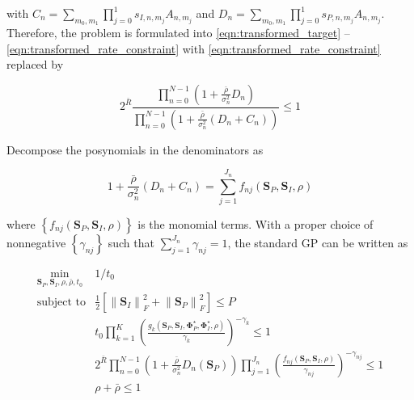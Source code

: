 with ${C_n} = \sum\nolimits_{{m_0},{m_1}} {\prod\nolimits_{j = 0}^1 {{s_{I,n,{m_j}}}{A_{n,{m_j}}}} } $ and ${D_n} = \sum\nolimits_{{m_0},{m_1}} {\prod\nolimits_{j = 0}^1 {{s_{P,n,{m_j}}}{A_{n,{m_j}}}} } $. Therefore, the problem is formulated into \ref{eqn:transformed_target} -- \ref{eqn:transformed_rate_constraint} with \ref{eqn:transformed_rate_constraint} replaced by

\begin{equation}\label{eqn:transformed_rate_constraint_lower_bound}
  {2^{\bar R}}\frac{{\prod\limits_{n = 0}^{N - 1} {\left( {1 + \frac{{\bar \rho }}{{\sigma _n^2}}{D_n}} \right)} }}{{\prod\limits_{n = 0}^{N - 1} {\left( {1 + \frac{{\bar \rho }}{{\sigma _n^2}}\left( {{D_n} + {C_n}} \right)} \right)} }} \leqslant 1
\end{equation}

Decompose the posynomials in the denominators as

\begin{equation}\label{eqn:posynomial_lower_bound}
  1 + \frac{{\bar \rho }}{{\sigma _n^2}}\left( {{D_n} + {C_n}} \right) = \sum\limits_{j = 1}^{{J_n}} {{f_{nj}}\left( {{{\mathbf{S}}_P},{{\mathbf{S}}_I},\rho } \right)}
\end{equation}

where $\left\{ {{f_{nj}}\left( {{{\mathbf{S}}_P},{{\mathbf{S}}_I},\rho } \right)} \right\}$ is the monomial terms. With a proper choice of nonnegative $\left\{ {{\gamma _{nj}}} \right\}$ such that $\sum\limits_{j = 1}^{{J_n}} {{\gamma _{nj}}}  = 1$, the standard GP can be written as

\begin{eqnarray}
  {\mathop {\min }\limits_{{{\mathbf{S}}_P},{{\mathbf{S}}_I},\rho ,\bar \rho ,{t_0}} }&{1/{t_0}} \label{eqn:lower_bound_target} \\
  {{\text{subject to}}}&{\frac{1}{2}\left[ {\left\| {{{\mathbf{S}}_I}} \right\|_F^2 + \left\| {{{\mathbf{S}}_P}} \right\|_F^2} \right] \leqslant P} \label{eqn:lower_bound_power_constraint} \\
  {}&{{t_0}\prod\limits_{k = 1}^K {{{\left( {\frac{{{g_k}\left( {{{\mathbf{S}}_P},{{\mathbf{S}}_I},{\mathbf{\Phi }}_P^ \star ,{\mathbf{\Phi }}_I^ \star ,\rho } \right)}}{{{\gamma _k}}}} \right)}^{ - {\gamma _k}}}}  \leqslant 1} \label{eqn:lower_bound_current_constraint} \\
  {}&{{2^{\bar R}}\prod\limits_{n = 0}^{N - 1} {\left( {1 + \frac{{\bar \rho }}{{\sigma _n^2}}{D_n}\left( {{{\mathbf{S}}_P}} \right)} \right)} \prod\limits_{j = 1}^{{J_n}} {{{\left( {\frac{{{f_{nj}}\left( {{{\mathbf{S}}_P},{{\mathbf{S}}_I},\rho } \right)}}{{{\gamma _{nj}}}}} \right)}^{ - {\gamma _{nj}}}}}  \leqslant 1} \label{eqn:lower_bound_rate_constraint} \\
  {}&{\rho  + \bar \rho  \leqslant 1 \label{eqn:lower_bound_ratio_constraint}}
\end{eqnarray}

